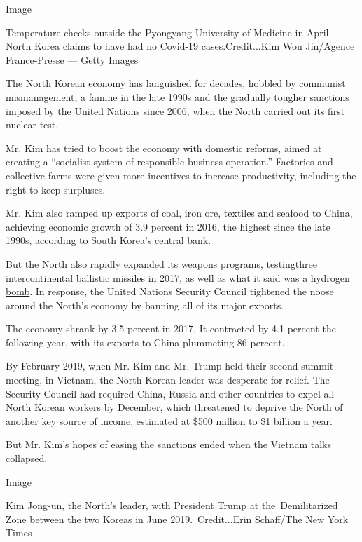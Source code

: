 Image

Temperature checks outside the Pyongyang University of Medicine in
April. North Korea claims to have had no Covid-19 cases.Credit...Kim Won
Jin/Agence France-Presse --- Getty Images

The North Korean economy has languished for decades, hobbled by
communist mismanagement, a famine in the late 1990s and the gradually
tougher sanctions imposed by the United Nations since 2006, when the
North carried out its first nuclear test.

Mr. Kim has tried to boost the economy with domestic reforms, aimed at
creating a ``socialist system of responsible business operation.''
Factories and collective farms were given more incentives to increase
productivity, including the right to keep surpluses.

Mr. Kim also ramped up exports of coal, iron ore, textiles and seafood
to China, achieving economic growth of 3.9 percent in 2016, the highest
since the late 1990s, according to South Korea's central bank.

But the North also rapidly expanded ​its weapons ​programs,
testing\href{https://www.nytimes3xbfgragh.onion/2017/11/30/world/asia/north-korea-missile-test.html}{three
intercontinental ballistic missiles} in 2017, as well as what it said
was
\href{https://www.nytimes3xbfgragh.onion/2017/09/03/world/asia/north-korea-tremor-possible-6th-nuclear-test.html}{a
hydrogen bomb}. In response, the United Nations Security Council
tightened the noose around the North's economy by banning all of its
major exports.​

The economy shrank by 3.5 percent in 2017. It contracted by 4.1 percent
the following year, with its exports to China plummeting 86 percent.

By February 2019, when Mr. Kim and Mr. Trump held their second summit
meeting, in Vietnam, the North Korean leader was desperate ​for relief​.
The Security Council had required China, Russia and other countries to
expel all
\href{https://www.nytimes3xbfgragh.onion/2015/02/20/world/asia/north-koreans-toil-in-slavelike-conditions-abroad-rights-groups-say.html}{North
Korean workers} by ​December, which threatened to deprive the North of
another key source of income, estimated at \$500 million to \$1 billion
a year.

But Mr. Kim's hopes of easing the sanctions ended when the Vietnam talks
collapsed.

Image

Kim Jong-un, the North's leader, with President Trump at
the~Demilitarized Zone between the two Koreas in June
2019.~Credit...Erin Schaff/The New York Times

